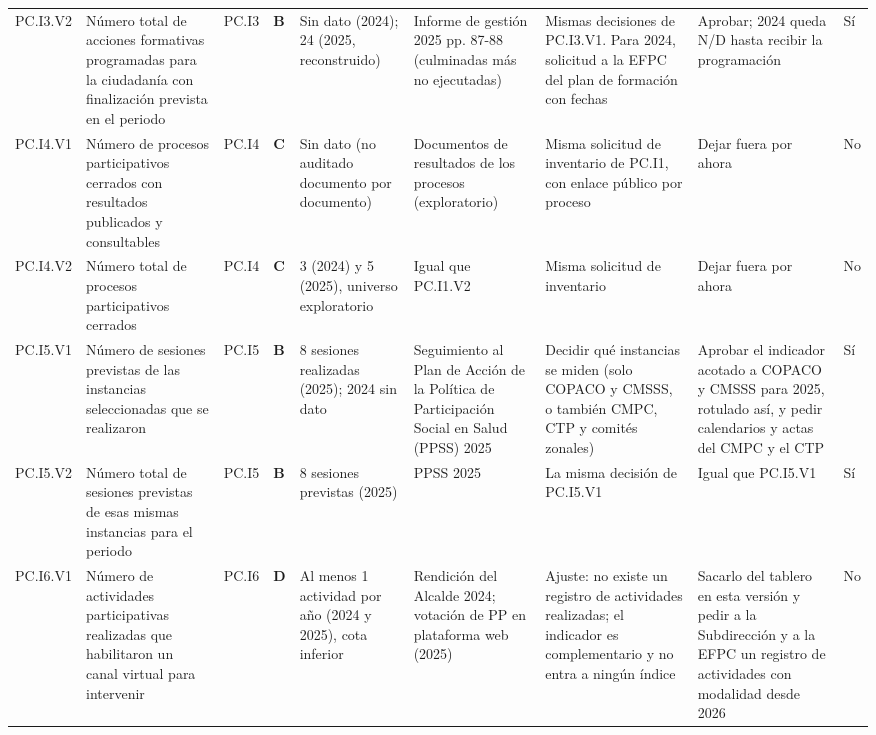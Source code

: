 \documentclass[11pt,letterpaper]{article}
\begin{document}
{\begin{xltabular}{\linewidth}{L{1.94cm}L{2.56cm}L{2.04cm}L{1.12cm}L{2.87cm}L{2.87cm}L{2.71cm}L{2.77cm}L{2.04cm}}
PC.I3.V2 & Número total de acciones formativas programadas para la ciudadanía con finalización prevista en el periodo & PC.I3 & \textbf{B} & Sin dato (2024); 24 (2025, reconstruido) & Informe de gestión 2025 pp. 87-88 (culminadas más no ejecutadas) & Mismas decisiones de PC.I3.V1. Para 2024, solicitud a la EFPC del plan de formación con fechas & Aprobar; 2024 queda N/D hasta recibir la programación & Sí \\
PC.I4.V1 & Número de procesos participativos cerrados con resultados publicados y consultables & PC.I4 & \textbf{C} & Sin dato (no auditado documento por documento) & Documentos de resultados de los procesos (exploratorio) & Misma solicitud de inventario de PC.I1, con enlace público por proceso & Dejar fuera por ahora & No \\
PC.I4.V2 & Número total de procesos participativos cerrados & PC.I4 & \textbf{C} & 3 (2024) y 5 (2025), universo exploratorio & Igual que PC.I1.V2 & Misma solicitud de inventario & Dejar fuera por ahora & No \\
PC.I5.V1 & Número de sesiones previstas de las instancias seleccionadas que se realizaron & PC.I5 & \textbf{B} & 8 sesiones realizadas (2025); 2024 sin dato & Seguimiento al Plan de Acción de la Política de Participación Social en Salud (PPSS) 2025 & Decidir qué instancias se miden (solo COPACO y CMSSS, o también CMPC, CTP y comités zonales) & Aprobar el indicador acotado a COPACO y CMSSS para 2025, rotulado así, y pedir calendarios y actas del CMPC y el CTP & Sí \\
PC.I5.V2 & Número total de sesiones previstas de esas mismas instancias para el periodo & PC.I5 & \textbf{B} & 8 sesiones previstas (2025) & PPSS 2025 & La misma decisión de PC.I5.V1 & Igual que PC.I5.V1 & Sí \\
PC.I6.V1 & Número de actividades participativas realizadas que habilitaron un canal virtual para intervenir & PC.I6 & \textbf{D} & Al menos 1 actividad por año (2024 y 2025), cota inferior & Rendición del Alcalde 2024; votación de PP en plataforma web (2025) & Ajuste: no existe un registro de actividades realizadas; el indicador es complementario y no entra a ningún índice & Sacarlo del tablero en esta versión y pedir a la Subdirección y a la EFPC un registro de actividades con modalidad desde 2026 & No \\

\end{xltabular}}
\end{document}
